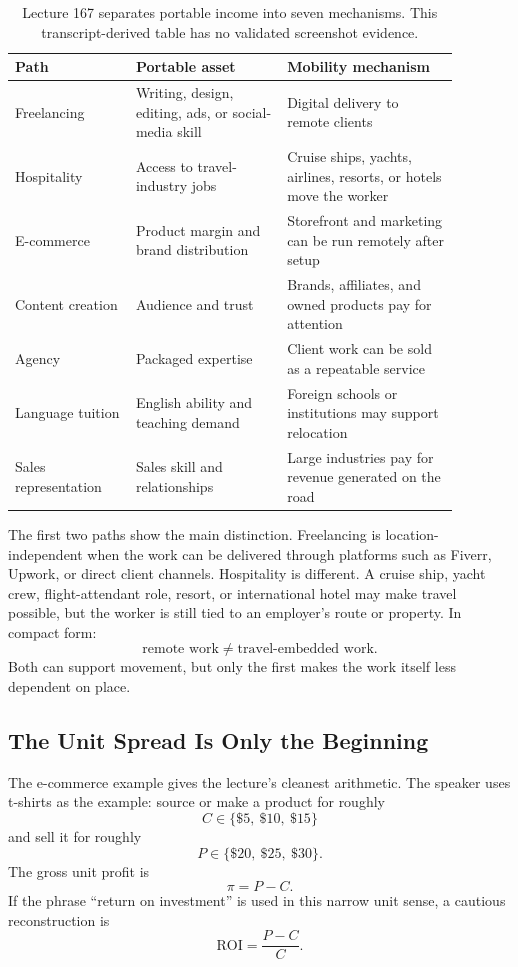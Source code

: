 \documentclass[11pt,oneside]{book}
\begin{document}
\begin{table}
\centering
\small
\begin{tabular}{p{0.24\linewidth}p{0.30\linewidth}p{0.34\linewidth}}
\hline
Path & Portable asset & Mobility mechanism \\
\hline
Freelancing & Writing, design, editing, ads, or social-media skill & Digital delivery to remote clients \\
Hospitality & Access to travel-industry jobs & Cruise ships, yachts, airlines, resorts, or hotels move the worker \\
E-commerce & Product margin and brand distribution & Storefront and marketing can be run remotely after setup \\
Content creation & Audience and trust & Brands, affiliates, and owned products pay for attention \\
Agency & Packaged expertise & Client work can be sold as a repeatable service \\
Language tuition & English ability and teaching demand & Foreign schools or institutions may support relocation \\
Sales representation & Sales skill and relationships & Large industries pay for revenue generated on the road \\
\hline
\end{tabular}
\caption{Lecture 167 separates portable income into seven mechanisms. This transcript-derived table has no validated screenshot evidence.}
\end{table}

The first two paths show the main distinction. Freelancing is location-independent when the work can be delivered through platforms such as Fiverr, Upwork, or direct client channels. Hospitality is different. A cruise ship, yacht crew, flight-attendant role, resort, or international hotel may make travel possible, but the worker is still tied to an employer's route or property. In compact form:
\[
\text{remote work}
\neq
\text{travel-embedded work}.
\]
Both can support movement, but only the first makes the work itself less dependent on place.

\subsection{The Unit Spread Is Only the Beginning}

The e-commerce example gives the lecture's cleanest arithmetic. The speaker uses t-shirts as the example: source or make a product for roughly
\[
C\in\{\$5,\ \$10,\ \$15\}
\]
and sell it for roughly
\[
P\in\{\$20,\ \$25,\ \$30\}.
\]
The gross unit profit is
\[
\pi=P-C.
\]
If the phrase ``return on investment'' is used in this narrow unit sense, a cautious reconstruction is
\[
\mathrm{ROI}=\frac{P-C}{C}.
\]
\end{document}
